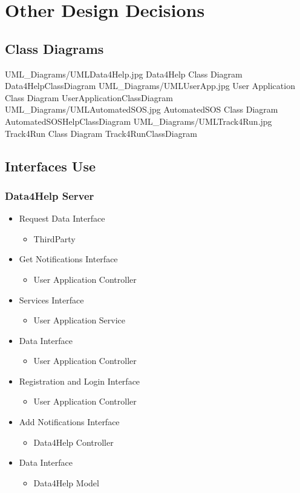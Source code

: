 \documentclass[../../DD.tex]{subfiles}
\begin{document}
\section{Other Design Decisions}
	\subsection{Class Diagrams}
	\image {13cm} {UML_Diagrams/UMLData4Help.jpg} {Data4Help Class Diagram} {Data4HelpClassDiagram}
	\image {13cm} {UML_Diagrams/UMLUserApp.jpg} {User Application Class Diagram} {UserApplicationClassDiagram}
	\image {13cm} {UML_Diagrams/UMLAutomatedSOS.jpg} {AutomatedSOS Class Diagram} {AutomatedSOSHelpClassDiagram}
	\image {13cm} {UML_Diagrams/UMLTrack4Run.jpg} {Track4Run Class Diagram} {Track4RunClassDiagram}

	\subsection{Interfaces Use}
		
		\subsubsection{Data4Help Server}
		\begin{itemize}
			\item Request Data Interface
			\begin{itemize}
				\item ThirdParty
			\end{itemize}
			\item Get Notifications Interface
			\begin{itemize}
				\item User Application Controller
			\end{itemize}
			\item Services Interface
			\begin{itemize}
				\item User Application Service
			\end{itemize}
			\item Data Interface
			\begin{itemize}
				\item User Application Controller
			\end{itemize}
			\item Registration and Login Interface
			\begin{itemize}
				\item User Application Controller
			\end{itemize}
			\item Add Notifications Interface
			\begin{itemize}
				\item Data4Help Controller
			\end{itemize}
			\item Data Interface
			\begin{itemize}
				\item Data4Help Model
			\end{itemize}
		\end{itemize}
\end{document}
